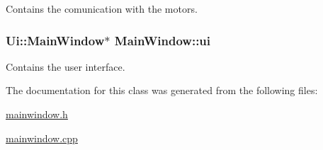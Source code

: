 Contains the comunication with the motors. 

\hypertarget{class_main_window_a35466a70ed47252a0191168126a352a5}{}
\subsubsection[{ui}]{\setlength{\rightskip}{0pt plus 5cm}Ui\+::\+Main\+Window$\ast$ Main\+Window\+::ui\hspace{0.3cm}{\ttfamily [private]}}\label{class_main_window_a35466a70ed47252a0191168126a352a5}


Contains the user interface. 



The documentation for this class was generated from the following files\+:\begin{DoxyCompactItemize}
\item 
\hyperlink{mainwindow_8h}{mainwindow.\+h}\item 
\hyperlink{mainwindow_8cpp}{mainwindow.\+cpp}\end{DoxyCompactItemize}
